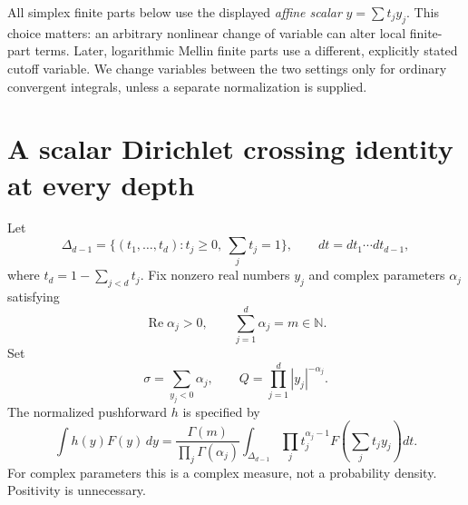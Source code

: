 \documentclass[11pt,letterpaper]{article}
\numberwithin{equation}{section}
\theoremstyle{definition}
\theoremstyle{remark}
\newcommand{\bcRe}{\operatorname{Re}}
\newcommand{\bcN}{\mathbb N}
\begin{document}
All simplex finite parts below use the displayed \emph{affine scalar}
$y=\sum t_j y_j$. This choice matters: an arbitrary nonlinear change of
variable can alter local finite-part terms. Later, logarithmic Mellin
finite parts use a different, explicitly stated cutoff variable. We
change variables between the two settings only for ordinary convergent
integrals, unless a separate normalization is supplied.

\section{A scalar Dirichlet crossing identity at every depth}
\label{bc:sec:scalar}

Let
\[
 \Delta_{d-1}=\{(t_1,\ldots,t_d):t_j\ge0,\ \sum_jt_j=1\},
 \qquad dt=dt_1\cdots dt_{d-1},
\]
where $t_d=1-\sum_{j<d}t_j$. Fix nonzero real numbers $y_j$ and complex
parameters $\alpha_j$ satisfying
\begin{equation}\label{bc:eq:scalar-assumptions}
 \bcRe\alpha_j>0,\qquad \sum_{j=1}^d\alpha_j=m\in\bcN.
\end{equation}
Set
\begin{equation}\label{bc:eq:scalar-data}
 \sigma=\sum_{y_j<0}\alpha_j,
 \qquad Q=\prod_{j=1}^d|y_j|^{-\alpha_j}.
\end{equation}
The normalized pushforward $h$ is specified by
\begin{equation}\label{bc:eq:pushforward}
 \int h(y)F(y)\,dy=
 \frac{\Gamma(m)}{\prod_j\Gamma(\alpha_j)}
 \int_{\Delta_{d-1}}\prod_jt_j^{\alpha_j-1}
                          F\left(\sum_jt_jy_j\right)dt.
\end{equation}
For complex parameters this is a complex measure, not a probability
density. Positivity is unnecessary.
\end{document}
